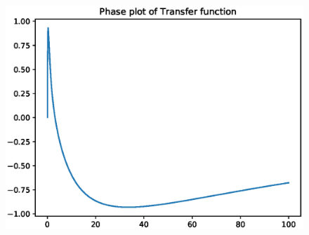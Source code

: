 \begin{enumerate}[label=\thesection.\arabic*.,ref=\thesection.\theenumi]
\begin{figure}[h!]
\centering
\includegraphics[width=\columnwidth]{figs/EE18BTECH11044.eps}
\end{figure}


\end{enumerate}
